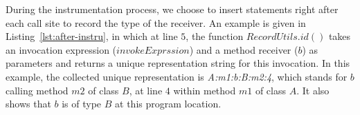 \documentclass{fac}
\newcommand{\keyword}[1]{\mathsf{#1}}
\begin{document}
During the instrumentation process, we choose to insert statements right after each call site to record the type of the receiver.
An example is given in Listing~\ref{lst:after-instru}, in which at line $5$, the function $RecordUtils.id()$ takes an invocation expression ($invokeExprssion$) and a method receiver ($b$) as parameters and returns a unique representation string for this invocation. In this example, the collected unique representation is \emph{A:m1:b:B:m2:4}, which stands for $b$ calling method $m2$ of class $B$, at line $4$ within method $m1$ of class $A$. It also shows that $b$ is of type $B$ at this program location.
%
%
\end{document}
